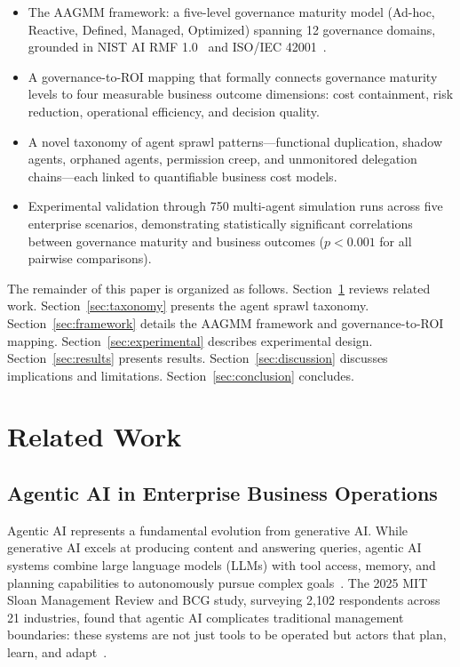 \documentclass[ai,article,submit,pdftex,moreauthors]{Definitions/mdpi}
\begin{document}
\begin{itemize}
\item[\textbf{C1.}] The AAGMM framework: a five-level governance maturity model (Ad-hoc, Reactive, Defined, Managed, Optimized) spanning 12 governance domains, grounded in NIST AI RMF 1.0~\cite{nist2023rmf} and ISO/IEC 42001~\cite{iso42001}.
\item[\textbf{C2.}] A governance-to-ROI mapping that formally connects governance maturity levels to four measurable business outcome dimensions: cost containment, risk reduction, operational efficiency, and decision quality.
\item[\textbf{C3.}] A novel taxonomy of agent sprawl patterns---functional duplication, shadow agents, orphaned agents, permission creep, and unmonitored delegation chains---each linked to quantifiable business cost models.
\item[\textbf{C4.}] Experimental validation through 750 multi-agent simulation runs across five enterprise scenarios, demonstrating statistically significant correlations between governance maturity and business outcomes ($p < 0.001$ for all pairwise comparisons).
\end{itemize}

The remainder of this paper is organized as follows. Section~\ref{sec:related} reviews related work. Section~\ref{sec:taxonomy} presents the agent sprawl taxonomy. Section~\ref{sec:framework} details the AAGMM framework and governance-to-ROI mapping. Section~\ref{sec:experimental} describes experimental design. Section~\ref{sec:results} presents results. Section~\ref{sec:discussion} discusses implications and limitations. Section~\ref{sec:conclusion} concludes.


\section{Related Work}\label{sec:related}

\subsection{Agentic AI in Enterprise Business Operations}\label{sec:related-agentic}

Agentic AI represents a fundamental evolution from generative AI. While generative AI excels at producing content and answering queries, agentic AI systems combine large language models (LLMs) with tool access, memory, and planning capabilities to autonomously pursue complex goals~\cite{wang2024survey,acharya2025agentic}. The 2025 MIT Sloan Management Review and BCG study, surveying 2,102 respondents across 21 industries, found that agentic AI complicates traditional management boundaries: these systems are not just tools to be operated but actors that plan, learn, and adapt~\cite{mitsloan2025emerging}.
\end{document}
